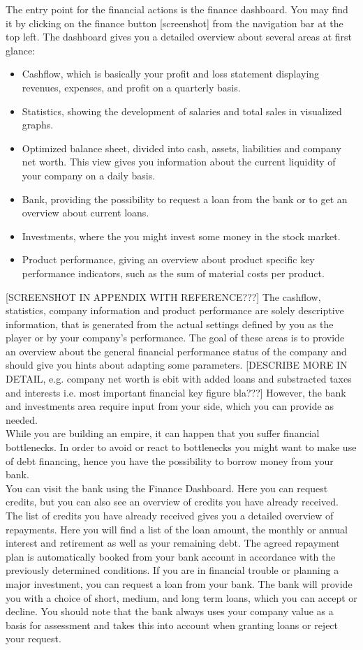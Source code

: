  The entry point for the financial actions is the finance dashboard. You may find it by clicking on the finance button [screenshot] from the navigation bar at the top left. The dashboard gives you a detailed overview about several areas at first glance:
\begin{itemize}
    \item Cashflow, which is basically your profit and loss statement displaying revenues, expenses, and profit on a quarterly basis.
    \item Statistics, showing the development of salaries and total sales in visualized graphs.
    \item Optimized balance sheet, divided into cash, assets, liabilities and company net worth. This view gives you information about the current liquidity of your company on a daily basis.
    \item Bank, providing the possibility to request a loan from the bank or to get an overview about current loans.
    \item Investments, where the you might invest some money in the stock market.
    \item Product performance, giving an overview about product specific key performance indicators, such as the sum of material costs per product.
\end{itemize}
[SCREENSHOT IN APPENDIX WITH REFERENCE???] The cashflow, statistics, company information and product performance are solely descriptive information, that is generated from the actual settings defined by you as the player or by your company’s performance. The goal of these areas is to provide an overview about the general financial performance status of the company and should give you hints about adapting some parameters. [DESCRIBE MORE IN DETAIL, e.g. company net worth is ebit with added loans and substracted taxes and interests i.e. most important financial key figure bla???] However, the bank and investments area require input from your side, which you can provide as needed. \\

While you are building an empire, it can happen that you suffer financial bottlenecks. In order to avoid or react to bottlenecks you might want to make use of debt financing, hence you have the possibility to borrow money from your bank. \\

You can visit the bank using the Finance Dashboard. Here you can request credits, but you can also see an overview of credits you have already received.
The list of credits you have already received gives you a detailed overview of repayments. Here you will find a list of the loan amount, the monthly or annual interest and retirement as well as your remaining debt. The agreed repayment plan is automatically booked from your bank account in accordance with the previously determined conditions.
If you are in financial trouble or planning a major investment, you can request a loan from your bank. The bank will provide you with a choice of short, medium, and long term loans, which you can accept or decline. You should note that the bank always uses your company value as a basis for assessment and takes this into account when granting loans or reject your request. 

